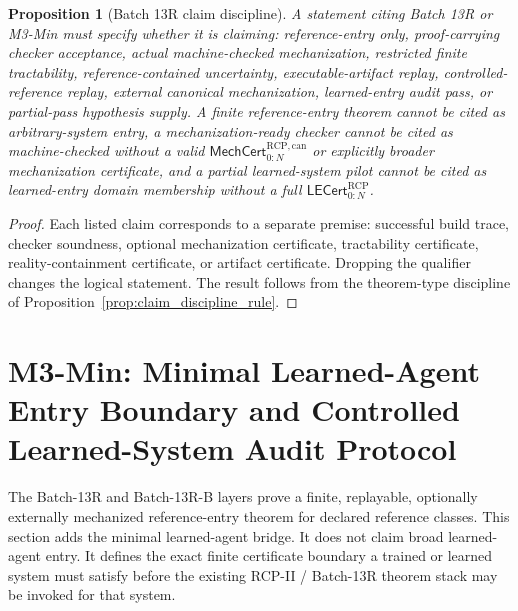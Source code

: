\documentclass[11pt]{article}
\newtheorem{proposition}[theorem]{Proposition}
\newcommand{\1}{\mathbf{1}}
\newcommand{\RCP}{\mathrm{RCP}}
\begin{document}
\begin{proposition}[Batch 13R claim discipline]
\label{prop:batch13r_claim_discipline}
A statement citing Batch 13R or M3-Min must specify whether it is claiming: reference-entry only, proof-carrying checker acceptance, actual machine-checked mechanization, restricted finite tractability, reference-contained uncertainty, executable-artifact replay, controlled-reference replay, external canonical mechanization, learned-entry audit pass, or partial-pass hypothesis supply.  A finite reference-entry theorem cannot be cited as arbitrary-system entry, a mechanization-ready checker cannot be cited as machine-checked without a valid \(\mathsf{MechCert}_{0:N}^{\RCP,\mathrm{can}}\) or explicitly broader mechanization certificate, and a partial learned-system pilot cannot be cited as learned-entry domain membership without a full \(\mathsf{LECert}_{0:N}^{\RCP}\).
\end{proposition}

\begin{proof}
Each listed claim corresponds to a separate premise: successful build trace, checker soundness, optional mechanization certificate, tractability certificate, reality-containment certificate, or artifact certificate.  Dropping the qualifier changes the logical statement.  The result follows from the theorem-type discipline of Proposition~\ref{prop:claim_discipline_rule}.
\end{proof}



\section{M3-Min: Minimal Learned-Agent Entry Boundary and Controlled Learned-System Audit Protocol}
\label{sec:m3_min_learned_agent_entry_boundary}

The Batch-13R and Batch-13R-B layers prove a finite, replayable, optionally externally mechanized reference-entry theorem for declared reference classes.  This section adds the minimal learned-agent bridge.  It does not claim broad learned-agent entry.  It defines the exact finite certificate boundary a trained or learned system must satisfy before the existing RCP-II / Batch-13R theorem stack may be invoked for that system.

\begin{center}
\end{center}
\end{document}
